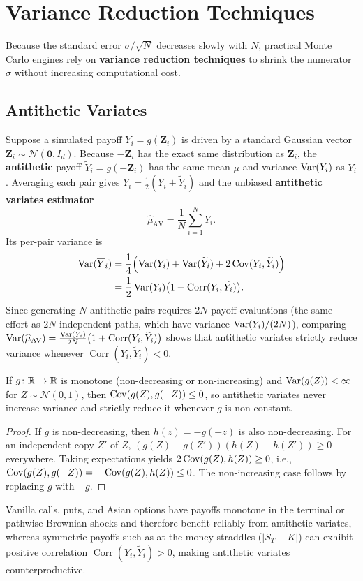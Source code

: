 \section{Variance Reduction Techniques}

Because the standard error $\sigma/\sqrt{N}$ decreases slowly with $N$, practical Monte Carlo engines rely on \textbf{variance reduction techniques} to shrink the numerator $\sigma$ without increasing computational cost.

\subsection*{Antithetic Variates}
Suppose a simulated payoff $Y_i = g(\mathbf{Z}_i)$ is driven by a standard Gaussian vector $\mathbf{Z}_i \sim \mathcal{N}(\mathbf{0}, I_d)$. Because $-\mathbf{Z}_i$ has the exact same distribution as $\mathbf{Z}_i$, the \textbf{antithetic} payoff $\widetilde{Y}_i = g(-\mathbf{Z}_i)$ has the same mean $\mu$ and variance $\operatorname{Var}(Y_i)$ as $Y_i$. Averaging each pair gives $\overline{Y}_i = \frac{1}{2}(Y_i + \widetilde{Y}_i)$ and the unbiased \textbf{antithetic variates estimator}
\[
\widehat{\mu}_{\mathrm{AV}} = \frac{1}{N}\sum_{i=1}^N \overline{Y}_i.
\]
Its per-pair variance is
\begin{align}
\operatorname{Var}(\overline{Y}_i) &= \frac{1}{4}\Bigl(\operatorname{Var}(Y_i) + \operatorname{Var}(\widetilde{Y}_i) + 2\operatorname{Cov}(Y_i, \widetilde{Y}_i)\Bigr) \nonumber \\
&= \frac{1}{2}\operatorname{Var}(Y_i)\bigl(1 + \operatorname{Corr}(Y_i, \widetilde{Y}_i)\bigr). \label{eq:antithetic-var}
\end{align}
Since generating $N$ antithetic pairs requires $2N$ payoff evaluations (the same effort as $2N$ independent paths, which have variance $\operatorname{Var}(Y_i)/(2N)$), comparing $\operatorname{Var}(\widehat{\mu}_{\mathrm{AV}}) = \frac{\operatorname{Var}(Y_i)}{2N}\bigl(1 + \operatorname{Corr}(Y_i, \widetilde{Y}_i)\bigr)$ shows that antithetic variates strictly reduce variance whenever $\operatorname{Corr}(Y_i, \widetilde{Y}_i) < 0$.

\begin{proposition}\label{prop:antithetic-monotone}
    If $g \colon \mathbb{R} \to \mathbb{R}$ is monotone (non-decreasing or non-increasing) and $\operatorname{Var}(g(Z)) < \infty$ for $Z \sim \mathcal{N}(0, 1)$, then $\operatorname{Cov}(g(Z), g(-Z)) \leq 0$, so antithetic variates never increase variance and strictly reduce it whenever $g$ is non-constant.
\end{proposition}
\begin{proof}
    If $g$ is non-decreasing, then $h(z) = -g(-z)$ is also non-decreasing. For an independent copy $Z'$ of $Z$, $(g(Z) - g(Z'))(h(Z) - h(Z')) \geq 0$ everywhere. Taking expectations yields $2\operatorname{Cov}(g(Z), h(Z)) \geq 0$, i.e., $\operatorname{Cov}(g(Z), g(-Z)) = -\operatorname{Cov}(g(Z), h(Z)) \leq 0$. The non-increasing case follows by replacing $g$ with $-g$.
\end{proof}
Vanilla calls, puts, and Asian options have payoffs monotone in the terminal or pathwise Brownian shocks and therefore benefit reliably from antithetic variates, whereas symmetric payoffs such as at-the-money straddles ($|S_T - K|$) can exhibit positive correlation $\operatorname{Corr}(Y_i, \widetilde{Y}_i) > 0$, making antithetic variates counterproductive.

